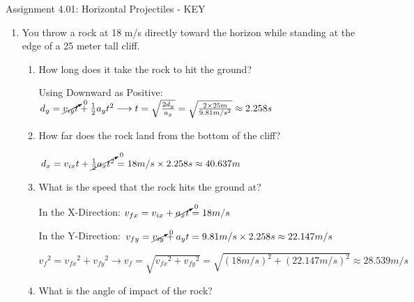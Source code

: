 \documentclass[letterpaper, 12pt]{article}
\begin{document}


\begin{center} Assignment 4.01: Horizontal Projectiles  - KEY
\end{center}





\begin{enumerate}

\item You throw a rock at 18 m/s directly toward the horizon while standing at the edge of a 25 meter tall cliff.  
\begin{enumerate}
	\item How long does it take the rock to hit the ground?
	
	\color{red} Using Downward as Positive: $d_y = \cancelto{0}{v_{iy}t} + \frac{1}{2}a_yt^2 \longrightarrow  t = \sqrt{\frac{2d_y}{a_y}}  = \sqrt{\frac{2 \times 25 m}{9.81 m/s^2}} \approx 2.258 s $ 
	
	\vspace{0.15in}
	\color{black}
	\item How far does the rock land from the bottom of the cliff?

	\color{red}
		$d_x = {v_{ix}t} + \cancelto{0}{\frac{1}{2}a_x t^2} = 18 m/s \times 2.258s \approx 40.637m $
	
	\vspace{0.15in}
	\color{black}
	
	\item What is the speed that the rock hits the ground at?	

	\color{red}
	In the X-Direction: $ v_{fx} = v_{ix} + \cancelto{0}{a_x t} = 18 m/s$
	
	In the Y-Direction: $ v_{fy} = \cancelto{0}{v_{iy}} + a_y t = 9.81 m/s \times 2.258s \approx 22.147 m/s$
	
 $ {v_f}^2 = {v_{fx}}^2 + {v_{fy}}^2 \longrightarrow {v_f} = \sqrt{{v_{fx}}^2 + {v_{fy}}^2} = \sqrt{(18 m/s)^2 + (22.147 m/s)^2} \approx 28.539 m/s  $
	
	\color{black}
	\item What is the angle of impact of the rock?
		\vspace{.1in}
		

\end{enumerate}
\end{enumerate}
\end{document}
